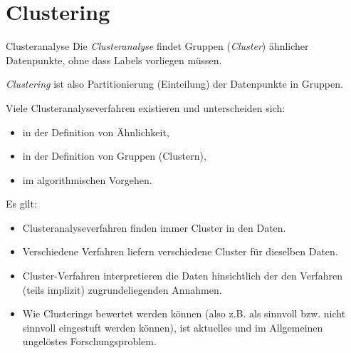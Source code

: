 \section{Clustering}

\begin{defi}{Clusteranalyse}
    Die \emph{Clusteranalyse} findet Gruppen (\emph{Cluster}) ähnlicher Datenpunkte, ohne dass Labels vorliegen müssen.

    \emph{Clustering} ist also Partitionierung (Einteilung) der Datenpunkte in Gruppen.

    Viele Clusteranalyseverfahren existieren und unterscheiden sich:
    \begin{itemize}
        \item in der Definition von Ähnlichkeit,
        \item in der Definition von Gruppen (Clustern),
        \item im algorithmischen Vorgehen.
    \end{itemize}

    Es gilt:
    \begin{itemize}
        \item Clusteranalyseverfahren finden immer Cluster in den Daten.
        \item Verschiedene Verfahren liefern verschiedene Cluster für dieselben Daten.
        \item Cluster-Verfahren interpretieren die Daten hinsichtlich der den Verfahren (teils implizit) zugrundeliegenden Annahmen.
        \item Wie Clusterings bewertet werden können (also z.B. als sinnvoll bzw. nicht sinnvoll eingestuft werden können), ist aktuelles und im Allgemeinen ungelöstes Forschungsproblem.
    \end{itemize}
\end{defi}

